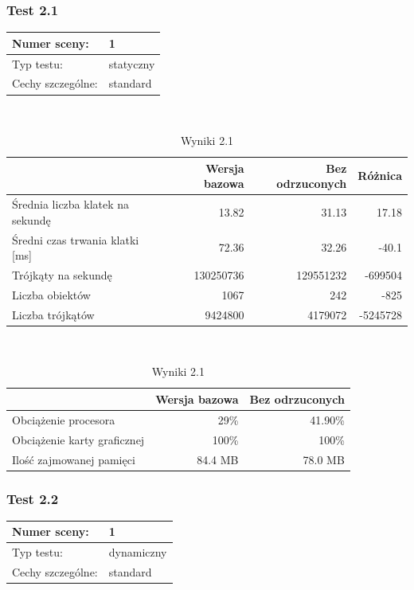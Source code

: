 \documentclass[a4paper,twoside,12pt]{book}
\begin{document}
\subsubsection{Test 2.1}
\begin{tabular}{|l||l|}
\hline
Numer sceny: & 1 \\
\hline
Typ testu: & statyczny \\
\hline
Cechy szczególne: & standard \\
\hline
\end{tabular}\\

\vbox{}

\begin{table}[H]
    \centering
    \caption{Wyniki 2.1}
    \label{tab:frustrum_test1}
    \begin{tabular}{|l||r|r|r|}
        \hline
        & Wersja bazowa & Bez odrzuconych & Różnica \\
        \hline
        Średnia liczba klatek na sekundę & 13.82 & 31.13 & 17.18 \\
        \hline
        Średni czas trwania klatki [ms] & 72.36 & 32.26 & -40.1 \\
        \hline
        Trójkąty na sekundę & 130250736 & 129551232 & -699504 \\
        \hline
        Liczba obiektów & 1067 & 242 & -825 \\
        \hline
        Liczba trójkątów & 9424800 & 4179072 & -5245728 \\
        \hline
    \end{tabular} \\
    
    \vspace*{0.5 cm}
    
    \begin{tabular}{|l||r|r|}
         \hline
        & Wersja bazowa & Bez odrzuconych \\
         \hline
        Obciążenie procesora & 29\% & 41.90\% \\
        \hline
        Obciążenie karty graficznej & 100\% & 100\% \\
        \hline
        Ilość zajmowanej pamięci & 84.4 MB & 78.0 MB \\
        \hline
    \end{tabular}
\end{table}

\subsubsection{Test 2.2}
\begin{tabular}{|l||l|}
\hline
Numer sceny: & 1 \\
\hline
Typ testu: & dynamiczny \\
\hline
Cechy szczególne: & standard \\
\hline
\end{tabular}\\
\end{document}
